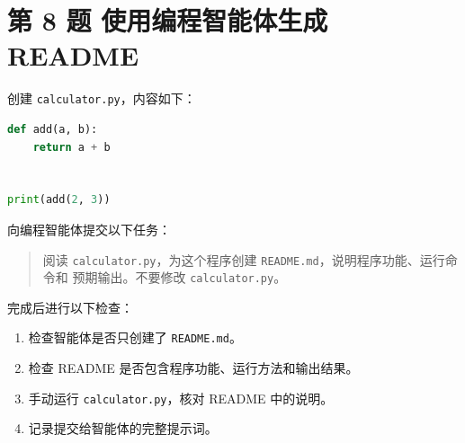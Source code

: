 \documentclass[a4paper,12pt]{report}
\begin{document}
\section{第 8 题 使用编程智能体生成 README}


创建 \texttt{calculator.py}，内容如下：

\begin{lstlisting}[language=Python]
def add(a, b):
    return a + b


print(add(2, 3))
\end{lstlisting}

向编程智能体提交以下任务：

\begin{quote}
阅读 \texttt{calculator.py}，为这个程序创建 \texttt{README.md}，说明程序功能、运行命令和
预期输出。不要修改 \texttt{calculator.py}。
\end{quote}

完成后进行以下检查：

\begin{enumerate}
  \item 检查智能体是否只创建了 \texttt{README.md}。
  \item 检查 README 是否包含程序功能、运行方法和输出结果。
  \item 手动运行 \texttt{calculator.py}，核对 README 中的说明。
  \item 记录提交给智能体的完整提示词。
\end{enumerate}

\end{document}
